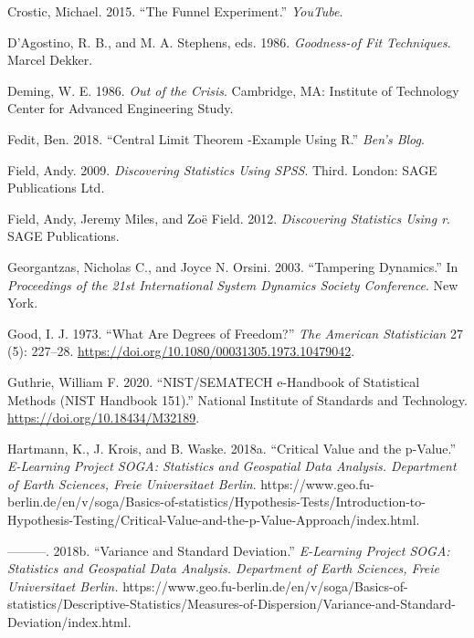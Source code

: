 \documentclass[
]{book}
\newlength{\cslhangindent}
\newenvironment{CSLReferences}[2] %
 {%
  \setlength{\parindent}{0pt}
  \ifodd #1 \everypar{\setlength{\hangindent}{\cslhangindent}}\ignorespaces\fi
  \ifnum #2 > 0
  \setlength{\parskip}{#2\baselineskip}
  \fi
 }%
 {}
\begin{document}
\begin{CSLReferences}{1}{0}
\leavevmode{}%
Crostic, Michael. 2015. {``The Funnel Experiment.''} \emph{YouTube}.

\leavevmode{}%
D'Agostino, R. B., and M. A. Stephens, eds. 1986. \emph{Goodness-of Fit Techniques}. {Marcel Dekker}.

\leavevmode{}%
Deming, W. E. 1986. \emph{Out of the Crisis}. {Cambridge, MA}: {Institute of Technology Center for Advanced Engineering Study}.

\leavevmode{}%
Fedit, Ben. 2018. {``Central {Limit Theorem} -Example Using {R}.''} \emph{Ben's Blog}.

\leavevmode{}%
Field, Andy. 2009. \emph{Discovering Statistics Using {SPSS}}. Third. {London}: {SAGE Publications Ltd}.

\leavevmode{}%
Field, Andy, Jeremy Miles, and Zoë Field. 2012. \emph{Discovering Statistics Using r}. {SAGE Publications}.

\leavevmode{}%
Georgantzas, Nicholas C., and Joyce N. Orsini. 2003. {``Tampering Dynamics.''} In \emph{Proceedings of the 21st {International System Dynamics Society Conference}}. {New York}.

\leavevmode{}%
Good, I. J. 1973. {``What Are Degrees of Freedom?''} \emph{The American Statistician} 27 (5): 227--28. \url{https://doi.org/10.1080/00031305.1973.10479042}.

\leavevmode{}%
Guthrie, William F. 2020. {``{NIST}/{SEMATECH} e-{Handbook} of {Statistical Methods} ({NIST Handbook} 151).''} {National Institute of Standards and Technology}. \url{https://doi.org/10.18434/M32189}.

\leavevmode{}%
Hartmann, K., J. Krois, and B. Waske. 2018a. {``Critical {Value} and the p-{Value}.''} \emph{E-Learning Project SOGA: Statistics and Geospatial Data Analysis. Department of Earth Sciences, Freie Universitaet Berlin}. https://www.geo.fu-berlin.de/en/v/soga/Basics-of-statistics/Hypothesis-Tests/Introduction-to-Hypothesis-Testing/Critical-Value-and-the-p-Value-Approach/index.html.

\leavevmode{}%
---------. 2018b. {``Variance and {Standard Deviation}.''} \emph{E-Learning Project SOGA: Statistics and Geospatial Data Analysis. Department of Earth Sciences, Freie Universitaet Berlin.} https://www.geo.fu-berlin.de/en/v/soga/Basics-of-statistics/Descriptive-Statistics/Measures-of-Dispersion/Variance-and-Standard-Deviation/index.html.


\end{CSLReferences}
\end{document}
